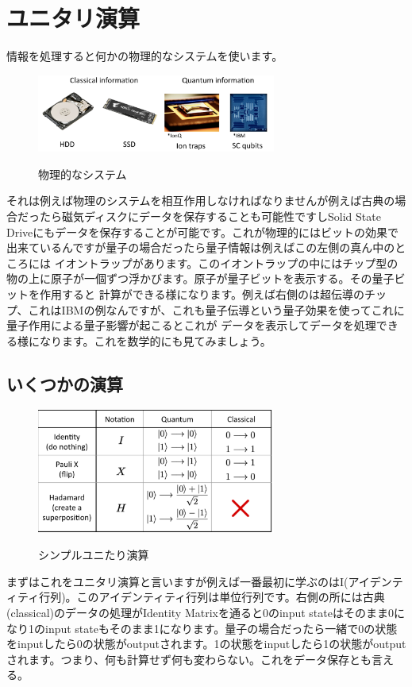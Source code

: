 \section{ユニタリ演算}
情報を処理すると何かの物理的なシステムを使います。
\begin{figure}[H]
    \centering
    \includegraphics[width=0.7\textwidth]{lesson2/ion_trap_etc.pdf}
    \label{fig: 1}
    \begin{center}
        \caption{物理的なシステム}
    \end{center}
\end{figure}
それは例えば物理のシステムを相互作用しなければなりませんが例えば古典の場合だったら磁気ディスクにデータを保存することも可能性ですしSolid State Driveにもデータを保存することが可能です。これが物理的にはビットの効果で出来ているんですが量子の場合だったら量子情報は例えばこの左側の真ん中のところには
イオントラップがあります。このイオントラップの中にはチップ型の物の上に原子が一個ずつ浮かびます。原子が量子ビットを表示する。その量子ビットを作用すると
計算ができる様になります。例えば右側のは超伝導のチップ、これはIBMの例なんですが、これも量子伝導という量子効果を使ってこれに量子作用による量子影響が起こるとこれが
データを表示してデータを処理できる様になります。これを数学的にも見てみましょう。
\subsection{いくつかの演算}
\begin{figure}[H]
    \centering
    \includegraphics[width=0.7\textwidth]{lesson2/simple_unitary_ops.pdf}
    \label{fig: 1}
    \begin{center}
        \caption{シンプルユニたり演算}
    \end{center}
\end{figure}
まずはこれをユニタリ演算と言いますが例えば一番最初に学ぶのはI(アイデンティティ行列)。このアイデンティティ行列は単位行列です。右側の所には古典(classical)のデータの処理がIdentity Matrixを通ると0のinput stateはそのまま0になり1のinput stateもそのまま1になります。量子の場合だったら一緒で0の状態をinputしたら0の状態がoutputされます。1の状態をinputしたら1の状態がoutputされます。つまり、何も計算せず何も変わらない。これをデータ保存とも言える。

